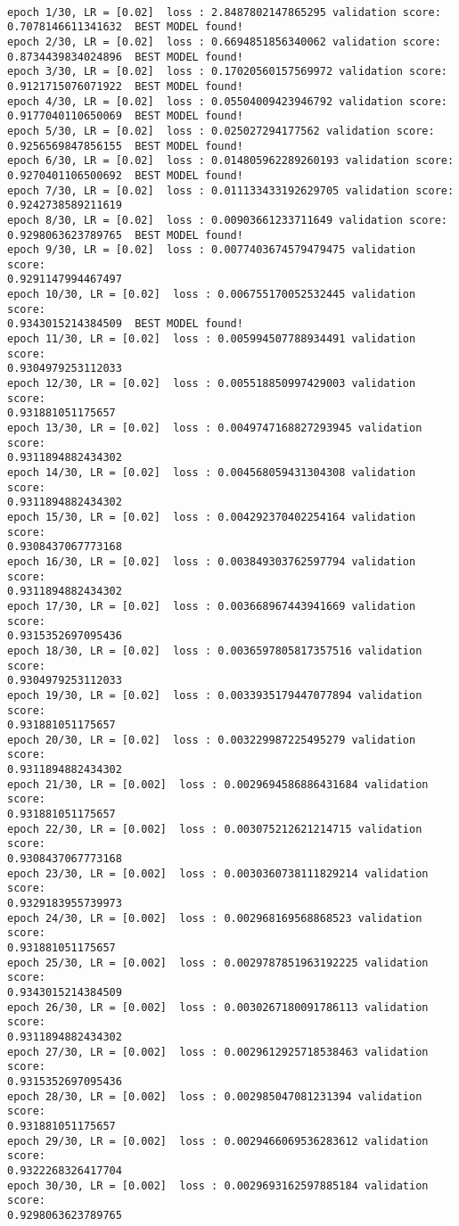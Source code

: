 \documentclass[11pt]{article}
\begin{document}
    \begin{Verbatim}[commandchars=\\\{\}]

epoch 1/30, LR = [0.02]  loss : 2.8487802147865295 validation score:
0.7078146611341632  BEST MODEL found!
epoch 2/30, LR = [0.02]  loss : 0.6694851856340062 validation score:
0.8734439834024896  BEST MODEL found!
epoch 3/30, LR = [0.02]  loss : 0.17020560157569972 validation score:
0.9121715076071922  BEST MODEL found!
epoch 4/30, LR = [0.02]  loss : 0.05504009423946792 validation score:
0.9177040110650069  BEST MODEL found!
epoch 5/30, LR = [0.02]  loss : 0.025027294177562 validation score:
0.9256569847856155  BEST MODEL found!
epoch 6/30, LR = [0.02]  loss : 0.014805962289260193 validation score:
0.9270401106500692  BEST MODEL found!
epoch 7/30, LR = [0.02]  loss : 0.011133433192629705 validation score:
0.9242738589211619
epoch 8/30, LR = [0.02]  loss : 0.00903661233711649 validation score:
0.9298063623789765  BEST MODEL found!
epoch 9/30, LR = [0.02]  loss : 0.0077403674579479475 validation score:
0.9291147994467497
epoch 10/30, LR = [0.02]  loss : 0.006755170052532445 validation score:
0.9343015214384509  BEST MODEL found!
epoch 11/30, LR = [0.02]  loss : 0.005994507788934491 validation score:
0.9304979253112033
epoch 12/30, LR = [0.02]  loss : 0.005518850997429003 validation score:
0.931881051175657
epoch 13/30, LR = [0.02]  loss : 0.0049747168827293945 validation score:
0.9311894882434302
epoch 14/30, LR = [0.02]  loss : 0.004568059431304308 validation score:
0.9311894882434302
epoch 15/30, LR = [0.02]  loss : 0.004292370402254164 validation score:
0.9308437067773168
epoch 16/30, LR = [0.02]  loss : 0.003849303762597794 validation score:
0.9311894882434302
epoch 17/30, LR = [0.02]  loss : 0.003668967443941669 validation score:
0.9315352697095436
epoch 18/30, LR = [0.02]  loss : 0.0036597805817357516 validation score:
0.9304979253112033
epoch 19/30, LR = [0.02]  loss : 0.0033935179447077894 validation score:
0.931881051175657
epoch 20/30, LR = [0.02]  loss : 0.003229987225495279 validation score:
0.9311894882434302
epoch 21/30, LR = [0.002]  loss : 0.0029694586886431684 validation score:
0.931881051175657
epoch 22/30, LR = [0.002]  loss : 0.003075212621214715 validation score:
0.9308437067773168
epoch 23/30, LR = [0.002]  loss : 0.0030360738111829214 validation score:
0.9329183955739973
epoch 24/30, LR = [0.002]  loss : 0.002968169568868523 validation score:
0.931881051175657
epoch 25/30, LR = [0.002]  loss : 0.0029787851963192225 validation score:
0.9343015214384509
epoch 26/30, LR = [0.002]  loss : 0.0030267180091786113 validation score:
0.9311894882434302
epoch 27/30, LR = [0.002]  loss : 0.0029612925718538463 validation score:
0.9315352697095436
epoch 28/30, LR = [0.002]  loss : 0.002985047081231394 validation score:
0.931881051175657
epoch 29/30, LR = [0.002]  loss : 0.0029466069536283612 validation score:
0.9322268326417704
epoch 30/30, LR = [0.002]  loss : 0.0029693162597885184 validation score:
0.9298063623789765
\end{Verbatim}
\end{document}
